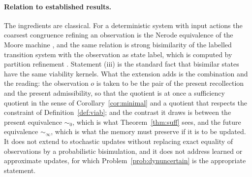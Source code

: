 \paragraph{Relation to established results.} The ingredients are classical. For a deterministic system with input actions the coarsest congruence refining an observation is the Nerode equivalence of the Moore machine \cite{moore1956}, and the same relation is strong bisimilarity of the labelled transition system with the observation as state label, which is computed by partition refinement \cite{milner1989}. Statement (iii) is the standard fact that bisimilar states have the same viability kernels. What the extension adds is the combination and the reading: the observation $o$ is taken to be the pair of the present recollection and the present admissibility, so that the quotient is at once a sufficiency quotient in the sense of Corollary~\ref{cor:minimal} and a quotient that respects the constraint of Definition~\ref{def:viab}; and the contrast it draws is between the present equivalence $\sim_0$, which is what Theorem~\ref{thm:suff} sees, and the future equivalence $\sim_\infty$, which is what the memory must preserve if it is to be updated. It does not extend to stochastic updates without replacing exact equality of observations by a probabilistic bisimulation, and it does not address learned or approximate updates, for which Problem~\ref{prob:dynuncertain} is the appropriate statement.

